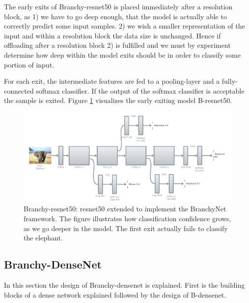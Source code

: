 \vspace{-20pt} \color{main-color}

The early exits of Branchy-\gls{resnet}50 is placed immediately after a resolution block, as 1) we have to go deep enough, that the model is actually able to correctly predict some input samples. 2) we wish a smaller representation of the input and within a resolution block the data size is unchanged. Hence if offloading after a resolution block 2) is fulfilled and we must by experiment determine how deep within the model exits should be in order to classify some portion of input.

For each exit, the intermediate features are fed to a pooling-layer and a fully-connected softmax classifier. If the output of the  softmax classifier is acceptable the sample is exited. Figure \ref{fig:b-resnet} visualizes the early exiting model B-\gls{resnet}50.

\begin{figure}
	\centering
	\includegraphics[width=\linewidth]{figures/models/BResNet}
	\caption[B-\gls{resnet} architecture]{Branchy-\gls{resnet}50: \gls{resnet}50 extended to implement the BranchyNet framework. The figure illustrates how classification confidence grows, as we go deeper in the model. The first exit actually fails to classify the elephant. }
	\label{fig:b-resnet}
\end{figure}


\subsection{Branchy-DenseNet}

In this section the design of Branchy-\gls{densenet} is explained. First is the building blocks of a dense network explained followed by the design of B-\gls{densenet}.

